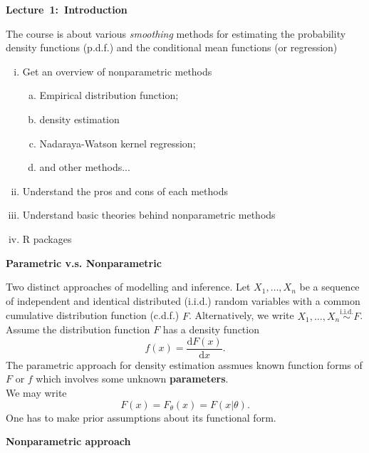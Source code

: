 \documentclass[19pt,landscaoe]{article}
\begin{document}
{\LARGE\centerline{\textbf{Lecture~1:~Introduction}}}
\vskip25pt
\begin{minipage}{.9\textwidth}
    \Large
    The course is about various {\it smoothing} methods for estimating the probability density functions (p.d.f.) and the conditional mean functions (or regression)
\begin{enumerate}[(i)]
\item Get an overview of nonparametric methods
\begin{enumerate}[a)]
    \item Empirical distribution function;
    \item density estimation
    \item Nadaraya-Watson kernel regression;
    \item and other methods...
\end{enumerate}
\item Understand the pros and cons of each methods
\item Understand basic theories behind nonparametric methods
\item R packages
\end{enumerate}
\end{minipage}
\newpage
{\Large\centerline{\textbf{Parametric v.s. Nonparametric}}}
\vskip25pt
\begin{minipage}{.9\textwidth}
    \Large
Two distinct approaches of modelling and inference. 
\vskip 5pt
Let $X_1,\dots,X_n$ be a sequence of independent and identical distributed (i.i.d.) random variables with a common cumulative distribution function (c.d.f.) $F$. Alternatively, we write $X_1,\dots,X_n\overset{\mathrm{i.i.d.}}{\sim}F$. \\Assume the distribution function $F$ has a density function $$f(x)=\frac{\mathrm{d}F(x)}{\mathrm{d}x}.$$  
The parametric approach for density estimation assmues known function forms of $F$ or $f$ which involves some unknown {\bf parameters}.\\ We may write
$$F(x)=F_\theta(x)=F(x|\theta).$$
One has to make prior assumptions about its functional form.
\end{minipage}
\newpage
{\LARGE\centerline{\textbf{Nonparametric approach }}}
\vskip25pt
\end{document}
